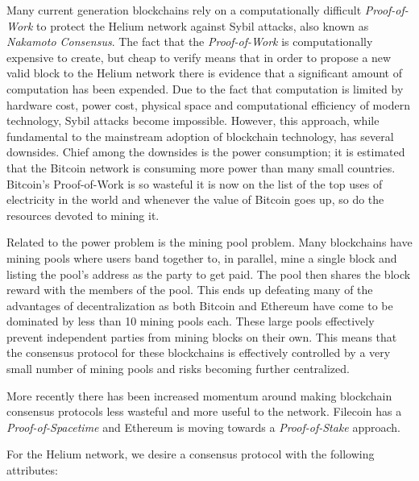 \documentclass[10pt, nonatbib, nocopyrightspace, reprint]{sigplanconf}
\begin{document}
Many current generation blockchains rely on a computationally difficult \emph{Proof-of-Work} to protect the Helium network against Sybil attacks, also known as \emph{Nakamoto Consensus}. The fact that the \emph{Proof-of-Work} is computationally expensive to create, but cheap to verify means that in order to propose a new valid block to the Helium network there is evidence that a significant amount of computation has been expended. Due to the fact that computation is limited by hardware cost, power cost, physical space and computational efficiency of modern technology, Sybil attacks become impossible. However, this approach, while fundamental to the mainstream adoption of blockchain technology, has several downsides. Chief among the downsides is the power consumption; it is estimated that the Bitcoin network is consuming more power than many small countries. Bitcoin's Proof-of-Work is so wasteful it is now on the list of the top uses of electricity in the world and whenever the value of Bitcoin goes up, so do the resources devoted to mining it.

Related to the power problem is the mining pool problem. Many blockchains have mining pools where users band together to, in parallel, mine a single block and listing the pool's address as the party to get paid. The pool then shares the block reward with the members of the pool. This ends up defeating many of the advantages of decentralization as both Bitcoin and Ethereum have come to be dominated by less than 10 mining pools each. These large pools effectively prevent independent parties from mining blocks on their own. This means that the consensus protocol for these blockchains is effectively controlled by a very small number of mining pools and risks becoming further centralized.

More recently there has been increased momentum around making blockchain consensus protocols less wasteful and more useful to the network. Filecoin \cite{filecoin} has a \emph{Proof-of-Spacetime} and Ethereum \cite{ethereum} is moving towards a \emph{Proof-of-Stake} \cite{pos} approach.

For the Helium network, we desire a consensus protocol with the following attributes:
\end{document}

